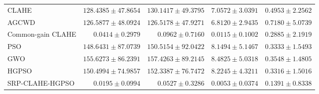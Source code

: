 \begin{table}[t]
\begin{tabular*}{\textwidth}{@{\extracolsep{\fill}}lrrrr@{}}
CLAHE & $128.4385 \pm 47.8654$ & $130.1417 \pm 49.3795$ & $7.0572 \pm 3.0391$ & $0.4953 \pm 2.2562$ \\
AGCWD & $126.5877 \pm 48.0924$ & $126.5178 \pm 47.9271$ & $6.8120 \pm 2.9435$ & $0.7180 \pm 5.0739$ \\
Common-gain CLAHE & $0.0414 \pm 0.2979$ & $0.0962 \pm 0.7160$ & $0.0115 \pm 0.1002$ & $0.2885 \pm 2.1919$ \\
PSO & $148.6431 \pm 87.0739$ & $150.5154 \pm 92.0422$ & $8.1494 \pm 5.1467$ & $0.3333 \pm 1.5493$ \\
GWO & $155.6273 \pm 86.2391$ & $157.4263 \pm 89.2145$ & $8.4825 \pm 5.0318$ & $0.3548 \pm 1.4805$ \\
HGPSO & $150.4994 \pm 74.9857$ & $152.3387 \pm 76.7472$ & $8.2245 \pm 4.3211$ & $0.3316 \pm 1.5016$ \\
SRP-CLAHE-HGPSO & $0.0195 \pm 0.0994$ & $0.0527 \pm 0.3286$ & $0.0053 \pm 0.0374$ & $0.1391 \pm 0.8338$ \\
\bottomrule\end{tabular*}
\end{table}
